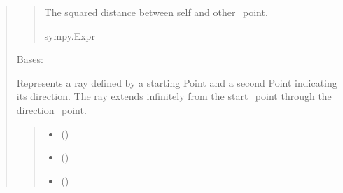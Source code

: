 \documentclass[letterpaper,10pt,english]{sphinxmanual}
\begin{document}
\begin{quote}
\begin{fulllineitems}
\begin{fulllineitems}
\begin{quote}
\begin{description}
\sphinxAtStartPar
The squared distance between self and other\_point.

\sphinxAtStartPar
sympy.Expr

\end{description}\end{quote}

\end{fulllineitems}


\end{fulllineitems}


\begin{fulllineitems}
\label{\detokenize{pygeox:pygeox.basic_objects.Ray}}
\pysigstartsignatures
\pysiglinewithargsret
{}
{\sphinxparamcomma {}\sphinxparamcomma {}}
{}
\pysigstopsignatures
\sphinxAtStartPar
Bases: 

\sphinxAtStartPar
Represents a ray defined by a starting Point and a second Point indicating its direction.
The ray extends infinitely from the start\_point through the direction\_point.
\begin{quote}\begin{description}
\begin{itemize}
\item {} 
\sphinxAtStartPar
{} ()

\item {} 
\sphinxAtStartPar
{} ()

\item {} 
\sphinxAtStartPar
{} (\sphinxstyleliteralemphasis{\sphinxupquote{ | }})

\end{itemize}

\end{description}\end{quote}


\end{fulllineitems}
\end{quote}
\end{document}
